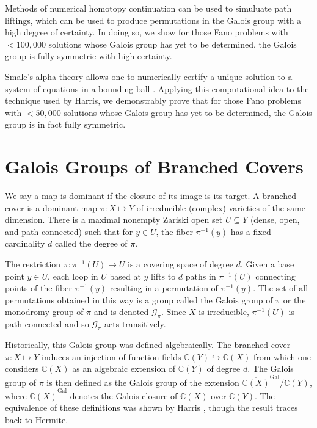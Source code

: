 \documentclass[12pt]{amsart}
\theoremstyle{definition}
\newcommand{\defcolor}[1]{{\color{RoyalBlue}#1}}
\begin{document}
Methods of numerical homotopy continuation can be used to simuluate path liftings, which can be used to produce permutations in the Galois group with a high degree of certainty. In doing so, we show for those Fano problems with $<100,000$ solutions whose Galois group has yet to be determined, the Galois group is fully symmetric with high certainty.

Smale's alpha theory allows one to numerically certify a unique solution to a system of equations in a bounding ball \cite{Smale}. Applying this computational idea to the technique used by Harris, we demonstrably prove that for those Fano problems with $<50,000$ solutions whose Galois group has yet to be determined, the Galois group is in fact fully symmetric. 



\section{Galois Groups of Branched Covers}
%   
We say a map is dominant if the closure of its image is its target. A \defcolor{branched cover} is a dominant map $\pi:X\mapsto Y$ of irreducible (complex) varieties of the same dimension. There is a maximal nonempty Zariski open set $U\subseteq Y$ (dense, open, and path-connected) such that for $y\in U$, the fiber $\pi^{-1}(y)$ has a fixed cardinality $d$ called the \defcolor{degree of $\pi$}.



%
The restriction $\pi:\pi^{-1}(U)\mapsto U$ is a covering space of degree $d$. Given a base point $y\in U$, each loop in $U$ based at $y$ lifts to $d$ paths in $\pi^{-1}(U)$ connecting points of the fiber $\pi^{-1}(y)$ resulting in a permutation of $\pi^{-1}(y)$. The set of all permutations obtained in this way is a group called the \defcolor{Galois group of $\pi$} or the \defcolor{monodromy group of $\pi$} and is denoted $\mathcal{G}_\pi$. Since $X$ is irreducible, $\pi^{-1}(U)$ is path-connected and so $\mathcal{G}_\pi$ acts transitively. 



%
Historically, this Galois group was defined algebraically. The branched cover $\pi:X\mapsto Y$ induces an injection of function fields $\mathbb{C}(Y)\hookrightarrow\mathbb{C}(X)$ from which one considers $\mathbb{C}(X)$ as an algebraic extension of $\mathbb{C}(Y)$ of degree $d$. The Galois group of $\pi$ is then defined as the Galois group of the extension $\overline{\mathbb{C}(X)}^{\text{Gal}}/\mathbb{C}(Y)$, where $\overline{\mathbb{C}(X)}^{\text{Gal}}$ denotes the Galois closure of $\mathbb{C}(X)$ over $\mathbb{C}(Y)$. The equivalence of these definitions was shown by Harris \cite{Harris}, though the result traces back to Hermite. 
\end{document}
